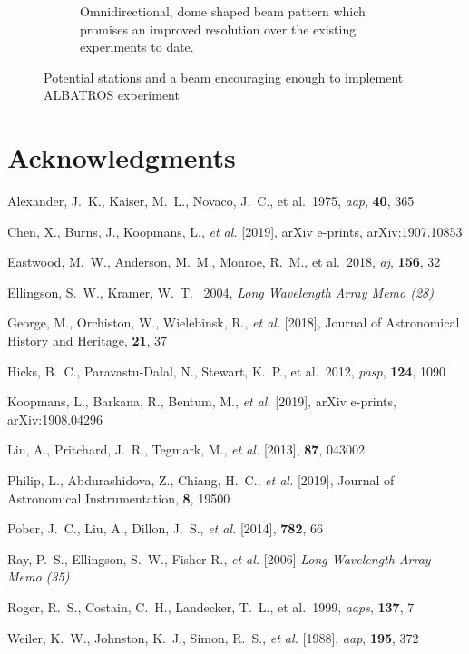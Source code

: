 \documentclass{ws-jai}
\begin{document}
\begin{figure}[h]
\begin{subfigure}[t]{0.5\textwidth}
		\caption{Omnidirectional, dome shaped beam pattern which promises an improved resolution over the existing experiments to date.}
		\label{Fig:beam}
	\end{subfigure}
	\caption{Potential stations and a beam encouraging enough to implement ALBATROS experiment}
	\label{Fig:10}
\end{figure}


	
\section*{Acknowledgments}

	
\begin{thebibliography}{9}

 Alexander, J.~K., Kaiser, M.~L., Novaco, J.~C., et al.\ 1975, {\it aap\/}, {\bf 40}, 365

 Chen, X., Burns, J., Koopmans, L., {\it et al.} [2019], arXiv e-prints, arXiv:1907.10853

 Eastwood, M.~W., Anderson, M.~M., Monroe, R.~M., et al.\ 2018, {\it aj\/}, {\bf 156}, 32

 Ellingson, S.~W., {Kramer}, W.~T. \ 2004, {\it Long Wavelength Array Memo (28)}

 George, M., Orchiston, W., Wielebinsk, R., {\it et al.} [2018], Journal of Astronomical History and Heritage, {\bf 21}, 37

 Hicks, B.~C., Paravastu-Dalal, N., Stewart, K.~P., et al.\ 2012, {\it pasp\/}, {\bf 124}, 1090

 Koopmans, L., Barkana, R., Bentum, M., {\it et al.} [2019], arXiv e-prints, arXiv:1908.04296

 Liu, A., Pritchard, J.~R., Tegmark, M., {\it et al.} [2013], {\bf 87}, 043002

 Philip, L., Abdurashidova, Z., Chiang, H.~C., {\it et al.} [2019], Journal of Astronomical Instrumentation, {\bf 8}, 19500

 Pober, J.~C., Liu, A., Dillon, J.~S., {\it et al.} [2014], {\bf 782}, 66

 Ray, P.~S., Ellingson, S.~W., Fisher R., {\it et al.} [2006] {\it Long Wavelength Array Memo (35)}

 Roger, R.~S., Costain, C.~H., Landecker, T.~L., et al.\ 1999, {\it aaps\/}, {\bf 137}, 7

 Weiler, K.~W., Johnston, K.~J., Simon, R.~S., {\it et al.} [1988], {\it aap\/}, {\bf 195}, 372






\end{thebibliography}
\end{document}
